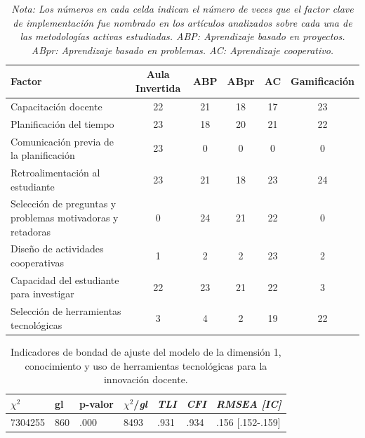 
\begin{table}[H]
    \centering
     \caption{Frecuencia de los factores clave o códigos detectados en las cinco metodologías activas.}
     
    \begin{tabular}{p{4.5cm}ccccc}
    \hline
       Factor	&	Aula Invertida	&	ABP	&	ABpr	&	AC	&	Gamificación	\\
     \hline
Capacitación docente	&	22	&	21	&	18	&	17	&	23	\\
Planificación del tiempo	&	23	&	18	&	20	&	21	&	22	\\
Comunicación previa de la planificación	&	23	&	0	&	0	&	0	&	0	\\
Retroalimentación al estudiante	&	23	&	21	&	18	&	23	&	24	\\
Selección de preguntas y problemas motivadoras y retadoras	&	0	&	24	&	21	&	22	&	0	\\
Diseño de actividades cooperativas	&	1	&	2	&	2	&	23	&	2	\\
Capacidad del estudiante para investigar	&	22	&	23	&	21	&	22	&	3	\\
Selección de herramientas tecnológicas	&	3	&	4	&	2	&	19	&	22	\\
 \hline
    \end{tabular}
    \caption*{\it{Nota}: Los números en cada celda indican el número de veces que el factor clave de implementación fue nombrado en los artículos analizados sobre cada una de las metodologías activas estudiadas. ABP: Aprendizaje basado en proyectos. ABpr: Aprendizaje basado en problemas. AC: Aprendizaje cooperativo. }
      \label{tab:FrecFactoresClave}
\end{table}



\begin{table}
\centering
\caption{\label{tab:BondadAjuste}Indicadores de bondad de ajuste del modelo de la dimensión 1, conocimiento y uso de herramientas tecnológicas para la innovación docente.}
\begin{tabular}{@{}lllllll@{}}
\toprule
\textbf{$\chi^{2}$} & \textbf{gl} & \textbf{p-valor} & \textbf{$\chi^{2}$/\textit{gl}} & \textit{TLI} & \textit{CFI} & \textit{RMSEA [IC]} \\ \midrule
7304255     & 860         & .000              & 8493           & .931         & .934         & .156 {[}.152-.159{]}   \\ \bottomrule
\end{tabular}
    
\end{table}
